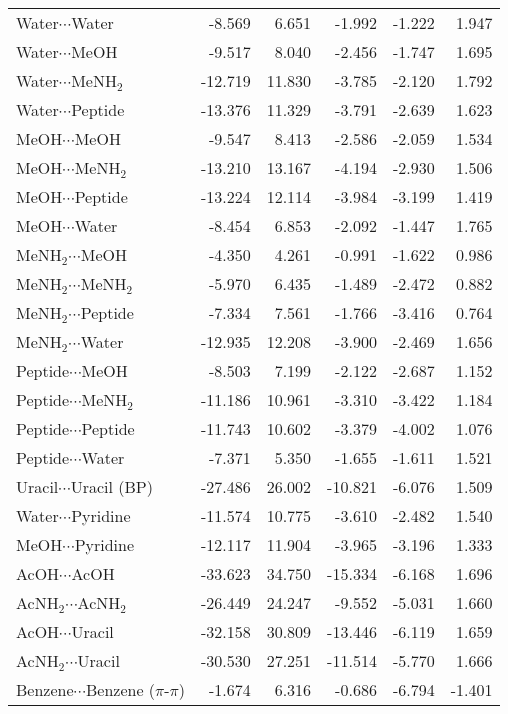 \begin{longtable}{lrrrrr}
Water$\cdots$Water & -8.569 & 6.651 & -1.992 & -1.222 & 1.947 \\
Water$\cdots$MeOH & -9.517 & 8.040 & -2.456 & -1.747 & 1.695 \\
Water$\cdots$MeNH$_2$ & -12.719 & 11.830 & -3.785 & -2.120 & 1.792 \\
Water$\cdots$Peptide & -13.376 & 11.329 & -3.791 & -2.639 & 1.623 \\
MeOH$\cdots$MeOH & -9.547 & 8.413 & -2.586 & -2.059 & 1.534 \\
MeOH$\cdots$MeNH$_2$ & -13.210 & 13.167 & -4.194 & -2.930 & 1.506 \\
MeOH$\cdots$Peptide & -13.224 & 12.114 & -3.984 & -3.199 & 1.419 \\
MeOH$\cdots$Water & -8.454 & 6.853 & -2.092 & -1.447 & 1.765 \\
MeNH$_2$$\cdots$MeOH & -4.350 & 4.261 & -0.991 & -1.622 & 0.986 \\
MeNH$_2$$\cdots$MeNH$_2$ & -5.970 & 6.435 & -1.489 & -2.472 & 0.882 \\
MeNH$_2$$\cdots$Peptide & -7.334 & 7.561 & -1.766 & -3.416 & 0.764 \\
MeNH$_2$$\cdots$Water & -12.935 & 12.208 & -3.900 & -2.469 & 1.656 \\
Peptide$\cdots$MeOH & -8.503 & 7.199 & -2.122 & -2.687 & 1.152 \\
Peptide$\cdots$MeNH$_2$ & -11.186 & 10.961 & -3.310 & -3.422 & 1.184 \\
Peptide$\cdots$Peptide & -11.743 & 10.602 & -3.379 & -4.002 & 1.076 \\
Peptide$\cdots$Water & -7.371 & 5.350 & -1.655 & -1.611 & 1.521 \\
Uracil$\cdots$Uracil (BP) & -27.486 & 26.002 & -10.821 & -6.076 & 1.509 \\
Water$\cdots$Pyridine & -11.574 & 10.775 & -3.610 & -2.482 & 1.540 \\
MeOH$\cdots$Pyridine & -12.117 & 11.904 & -3.965 & -3.196 & 1.333 \\
AcOH$\cdots$AcOH & -33.623 & 34.750 & -15.334 & -6.168 & 1.696 \\
AcNH$_2$$\cdots$AcNH$_2$ & -26.449 & 24.247 & -9.552 & -5.031 & 1.660 \\
AcOH$\cdots$Uracil & -32.158 & 30.809 & -13.446 & -6.119 & 1.659 \\
AcNH$_2$$\cdots$Uracil & -30.530 & 27.251 & -11.514 & -5.770 & 1.666 \\
Benzene$\cdots$Benzene ($\pi$-$\pi$) & -1.674 & 6.316 & -0.686 & -6.794 & -1.401 \\

\end{longtable}
